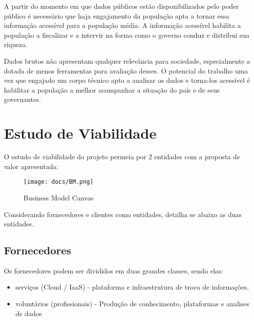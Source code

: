 \documentclass[journal]{IEEEtran}
\begin{document}
A partir do momento em que dados públicos estão disponibilizados pelo poder público é necessário que haja engajamento da população apta a tornar essa informação acessível para a população média. A informação acessível habilita a população a fiscalizar e a intervir na forma como o governo conduz e distribui sua riqueza.

Dados brutos não apresentam qualquer relevância para sociedade, especialmente a dotada de menos ferramentas para avaliação desses. O potencial do trabalho uma vez que engajado um corpo técnico apto a analisar os dados e torna-los acessível é habilitar a população a melhor acompanhar a situação do país e de seus governantes.

\section{Estudo de Viabilidade}

O estudo de viabilidade do projeto permeia por 2 entidades com a proposta de valor apresentada:
\begin{figure}[htpb]
    \centering
    \texttt{[image: docs/BM.png]}
    \caption{Business Model Canvas}
    \label{fig:BM}
    \centering
\end{figure}

Considerando fornecedores e clientes como entidades, detalha se abaixo as duas entidades.
\subsection{Fornecedores}
Os fornecedores podem ser divididos em duas grandes classes, sendo elas:
\begin{itemize}
    \item serviços (Cloud / IaaS) - plataforma e infraestrutura de troca de informações.
    \item voluntários (profissionais) - Produção de conhecimento, plataformas e analises de dados
\end{itemize}
\end{document}
